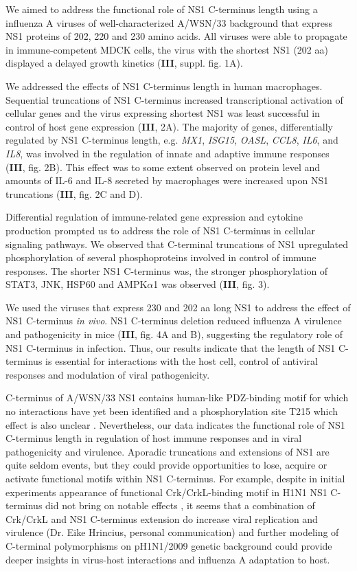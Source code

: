 		We aimed to address the functional role of NS1 C-terminus length using a influenza A viruses of well-characterized A/WSN/33 background that express NS1 proteins of 202, 220 and 230 amino acids. All viruses were able to propagate in immune-competent MDCK cells, the virus with the shortest NS1 (202 \gls{aa}) displayed a delayed growth kinetics (\textbf{III}, suppl. fig. 1A). 
		
		We addressed the effects of NS1 C-terminus length in human macrophages. Sequential truncations of NS1 C-terminus increased transcriptional activation of cellular genes and the virus expressing shortest NS1 was least successful in control of host gene expression (\textbf{III}, 2A). The majority of genes, differentially regulated by NS1 C-terminus length, e.g. \textit{MX1}, \textit{ISG15}, \textit{OASL}, \textit{CCL8}, \textit{IL6}, and \textit{IL8}, was involved in the regulation of innate and adaptive immune responses (\textbf{III}, fig. 2B).  This effect was to some extent observed on protein level and amounts of IL-6 and IL-8 secreted by macrophages were increased upon NS1 truncations (\textbf{III}, fig. 2C and D). 
		
		Differential regulation of immune-related gene expression and cytokine production prompted us to address the role of NS1 C-terminus in cellular signaling pathways. We observed that C-terminal truncations of NS1 upregulated phosphorylation of several phosphoproteins involved in control of immune responses. The shorter NS1 C-terminus was, the stronger phosphorylation of STAT3, JNK, HSP60 and AMPK$\alpha$1 was observed (\textbf{III}, fig. 3). 
				
		We used the viruses that express 230 and 202 aa long NS1 to address the effect of NS1 C-terminus \textit{in vivo}. NS1 C-terminus deletion reduced influenza A virulence and pathogenicity in mice (\textbf{III}, fig. 4A and B), suggesting the regulatory role of NS1 C-terminus in infection. Thus, our results indicate that the length of NS1 C-terminus is essential for interactions with the host cell, control of antiviral responses and modulation of viral pathogenicity. 
		
		C-terminus of A/WSN/33 NS1 contains human-like PDZ-binding motif for which no interactions have yet been identified and a phosphorylation site T215 which effect is also unclear \parencite{Jackson2010, Hsiang2012}. Nevertheless, our data indicates the functional role of NS1 C-terminus length in regulation of host immune responses and in viral pathogenicity and virulence. Aporadic truncations and extensions of NS1 are quite seldom events, but they could provide opportunities to lose, acquire or activate functional motifs within NS1 C-terminus. For example, despite in initial experiments appearance of functional Crk/CrkL-binding motif in H1N1 NS1 C-terminus did not bring on notable effects \parencite{Hale2010e}, it seems that a combination of Crk/CrkL and NS1 C-terminus extension do increase viral replication and virulence (Dr. Eike Hrincius, personal communication) and further modeling of C-terminal polymorphisms on pH1N1/2009 genetic background could provide deeper insights in virus-host interactions and influenza A adaptation to host.
		
